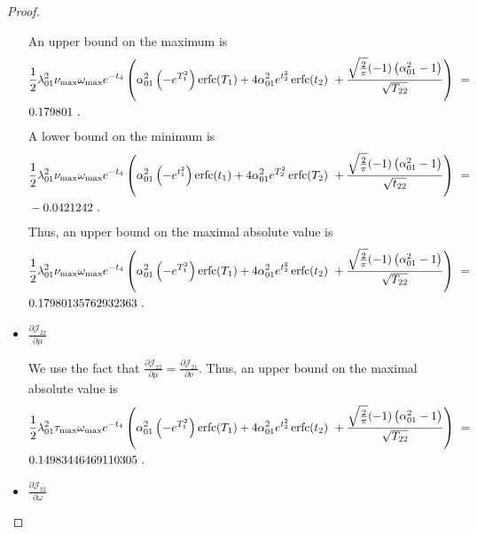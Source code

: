 \documentclass{article}
\DeclareMathOperator{\erfc}{erfc}
\begin{document}
\begin{proof}
\begin{itemize}
An upper bound on the maximum is
\begin{align}
&\frac{1}{2} \lambda_{\rm 01}^2 \nu_{\rm max} \omega_{\rm max}
  e^{-t_4} \left(\alpha_{\rm 01}^2
  \left(-e^{T_1^2}\right) \erfc (T_1)+4
  \alpha_{\rm 01}^2 e^{t_2^2}
  \erfc (t_2)\ + \frac{\sqrt{\frac{2}{\pi }} (-1)
  \left(\alpha_{\rm 01}^2-1\right)}{\sqrt{T_{22}}}\right) \
  = \ \\ \nonumber & 0.179801 \ .
\end{align}
A lower bound on the minimum is
\begin{align}
&\frac{1}{2} \lambda_{\rm 01}^2 \nu_{\rm max} \omega_{\rm max}
  e^{-t_4} \left(\alpha_{\rm 01}^2
  \left(-e^{t_1^2}\right) \erfc (t_1)+4
  \alpha_{\rm 01}^2 e^{T_2^2}
  \erfc (T_2)\ + \frac{\sqrt{\frac{2}{\pi }} (-1)
  \left(\alpha_{\rm 01}^2-1\right)}{\sqrt{t_{22}}}\right) \
  = \ \\ \nonumber
&-0.0421242 \ .
\end{align}
Thus, an upper bound on the maximal absolute value is 
\begin{align}
&\frac{1}{2} \lambda_{\rm 01}^2 \nu_{\rm max} \omega_{\rm max}
  e^{-t_4} \left(\alpha_{\rm 01}^2
  \left(-e^{T_1^2}\right) \erfc (T_1)+4
  \alpha_{\rm 01}^2 e^{t_2^2}
  \erfc (t_2)\ +  \frac{\sqrt{\frac{2}{\pi }} (-1)
  \left(\alpha_{\rm 01}^2-1\right)}{\sqrt{T_{22}}}\right) \
  = \ \\ \nonumber 
&0.17980135762932363 \ .
\end{align}

\item $\frac{\partial {\mathcal J}_{22}}{\partial \mu}$


We use the fact that $\frac{\partial {\mathcal J}_{22}}{\partial \mu}=\frac{\partial {\mathcal J}_{21}}{\partial \nu}$.
Thus, an upper bound on the maximal absolute value is 
\begin{align}
&\frac{1}{2} \lambda_{\rm 01}^2 \tau_{\rm max} \omega_{\rm max}
  e^{-t_4} \left(\alpha_{\rm 01}^2
  \left(-e^{T_1^2}\right) \erfc (T_1)+4
  \alpha_{\rm 01}^2 e^{t_2^2}
  \erfc (t_2)\ + \frac{\sqrt{\frac{2}{\pi }} (-1)
  \left(\alpha_{\rm 01}^2-1\right)}{\sqrt{T_{22}}}\right) \
  = \ \\ \nonumber
&0.14983446469110305 \ .
\end{align}

\item $\frac{\partial {\mathcal J}_{22}}{\partial \omega}$


\end{itemize}
\end{proof}
\end{document}
